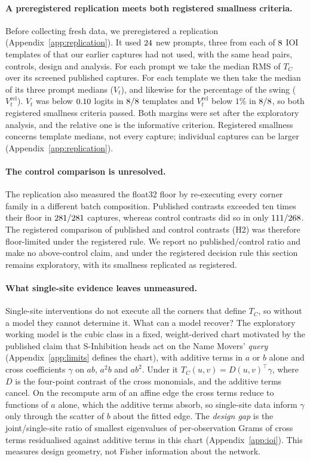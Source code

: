 \documentclass{article}
\theoremstyle{plain}
\theoremstyle{definition}
\begin{document}
\paragraph{A preregistered replication meets both registered smallness criteria.} Before collecting fresh data, we
preregistered a replication (Appendix~\ref{app:replication}). It used $24$ new prompts, three from each of $8$ IOI
templates of \citet{wang2022ioi} that our earlier captures had not used, with the same head pairs, controls, design
and analysis. For each prompt we take the median RMS of $T_C$ over its screened published captures. For each template
we then take the median of its three prompt medians ($V_t$), and likewise for the percentage of the swing
($V_t^{\mathrm{rel}}$). $V_t$ was below $0.10$ logits in $8/8$ templates and $V_t^{\mathrm{rel}}$ below
$1\%$ in $8/8$, so both registered smallness criteria passed. Both margins were set after the exploratory
analysis, and the relative one is the informative criterion. Registered smallness concerns template medians, not
every capture; individual captures can be larger (Appendix~\ref{app:replication}).

\paragraph{The control comparison is unresolved.} The replication also measured the float32 floor by re-executing every
corner family in a different batch composition. Published contrasts exceeded ten times their floor in
$281/281$ captures, whereas control contrasts did so in only $111/268$. The registered comparison of
published and control contrasts (H2) was therefore floor-limited under the registered rule. We report no
published/control ratio and make no above-control claim, and under the registered decision rule this section remains
exploratory, with its smallness replicated as registered.

\paragraph{What single-site evidence leaves unmeasured.} Single-site interventions do not execute all the corners that define $T_C$, so without a model they cannot determine it. What can a model recover? The exploratory working model is the cubic class in a fixed, weight-derived chart motivated by the published claim that S-Inhibition heads act on the Name Movers' \emph{query} (Appendix~\ref{app:limits} defines the chart), with additive terms in $a$ or $b$ alone and cross coefficients $\gamma$ on $ab$, $a^2b$ and $ab^2$. Under it $T_C(u,v)=D(u,v)^\top\gamma$, where $D$ is the four-point contrast of the cross monomials, and the additive terms cancel. On the recompute arm of an affine edge the cross terms reduce to functions of $a$ alone, which the additive terms absorb, so single-site data inform $\gamma$ only through the scatter of $b$ about the fitted edge. The \emph{design gap} is the joint/single-site ratio of smallest eigenvalues of per-observation Grams of cross terms residualised against additive terms in this chart (Appendix~\ref{app:ioi}). This measures design geometry, not Fisher information about the network.
\end{document}
